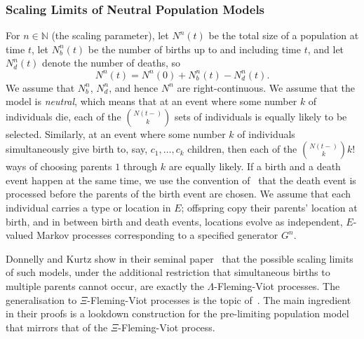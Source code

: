 \documentclass[reqno,draft]{amsart}
\numberwithin{equation}{section}
\theoremstyle{plain}
\theoremstyle{remark}
\newcommand{\N}{\mathbb{N}} %
\begin{document}
\subsubsection{Scaling Limits of Neutral Population Models}
For $n\in \N$ (the scaling parameter), let $N^n(t)$ be the total size of a population at time $t$, let $N_b^n(t)$ be the number of births up to and including time $t$, and let $N_d^n(t)$ denote the number of deaths, so \[
    N^n(t) = N^n(0) + N^n_b(t) - N^n_d(t).
\]
We assume that $N^n_b$, $N^n_d$, and hence $N^n$ are right-continuous. We assume that the model is \emph{neutral}, which means that at an event where some number $k$ of individuals die, each of the $\binom{N(t-)}{k} $ sets of individuals is equally likely to be selected. Similarly, at an event where some number $k$ of individuals simultaneously give birth to, say, $c_1, \ldots ,c_k$ children, then each of the $\binom{N(t-)}{k} k!$ ways of choosing parents $1$ through $k$ are equally likely. If a birth and a death event happen at the same time, we use the convention of~\cite{DK99} that the death event is processed before the parents of the birth event are chosen. We assume that each individual carries a type or location in $E$; offspring copy their parents' location at birth, and in between birth and death events, locations evolve as independent, $E$-valued Markov processes corresponding to a specified generator $G^n$.

Donnelly and Kurtz show in their seminal paper~\cite{DK99} that the possible scaling limits of such models, under the additional restriction that simultaneous births to multiple parents cannot occur, are exactly the $\Lambda$-Fleming-Viot processes. The generalisation to $\Xi$-Fleming-Viot processes is the topic of~\cite{xiflemingviot}. The main ingredient in their proofs is a lookdown construction for the pre-limiting population model that mirrors that of the $\Xi$-Fleming-Viot process.
\end{document}
